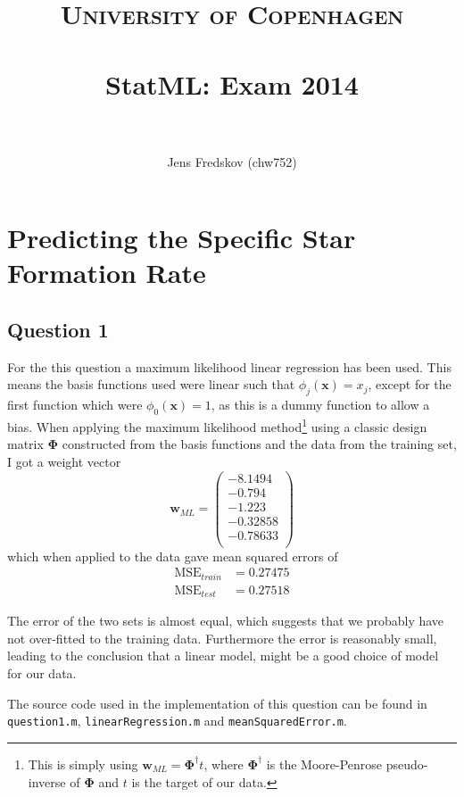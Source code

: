 \documentclass[a4paper, 11pt]{article}
\title{ 
\normalfont\normalsize 
\textsc{University of Copenhagen} \\ [25pt]
\horrule{0.5pt} \\[0.4cm]
\huge StatML\@: Exam 2014\\
\horrule{2pt} \\[0.5cm]
}
\author{Jens Fredskov (chw752)}
\begin{document}
\maketitle
\pagebreak

\section{Predicting the Specific Star Formation Rate} %
\label{sec:predicting_the_specific_star_formation_rate}

\subsection*{Question 1}
For the this question a maximum likelihood linear regression has been used. This means the basis functions used were linear such that $\phi_j(\mathbf{x}) = x_j$, except for the first function which were $\phi_0(\mathbf{x}) = 1$, as this is a dummy function to allow a bias. When applying the maximum likelihood method\footnote{This is simply using $\mathbf{w}_{\mathit{ML}} = \bm\Phi^\dagger t$, where $\bm\Phi^\dagger$ is the Moore-Penrose pseudo-inverse of $\bm\Phi$ and $t$ is the target of our data.} using a classic design matrix $\bm\Phi$ constructed from the basis functions and the data from the training set, I got a weight vector
\[
    \mathbf{w}_{\mathit{ML}} = \begin{pmatrix}
      -8.1494 \\
       -0.794 \\
       -1.223 \\
     -0.32858 \\
     -0.78633 \\
    \end{pmatrix}
    \label{eq:wml}
\]
which when applied to the data gave mean squared errors of
\begin{align*}
    \mathrm{MSE}_{\mathit{train}} &= 0.27475 \\
    \mathrm{MSE}_{\mathit{test}} &= 0.27518
\end{align*}

The error of the two sets is almost equal, which suggests that we probably have not over-fitted to the training data. Furthermore the error is reasonably small, leading to the conclusion that a linear model, might be a good choice of model for our data.

The source code used in the implementation of this question can be found in \texttt{question1.m}, \texttt{linearRegression.m} and \texttt{meanSquaredError.m}.
\end{document}
